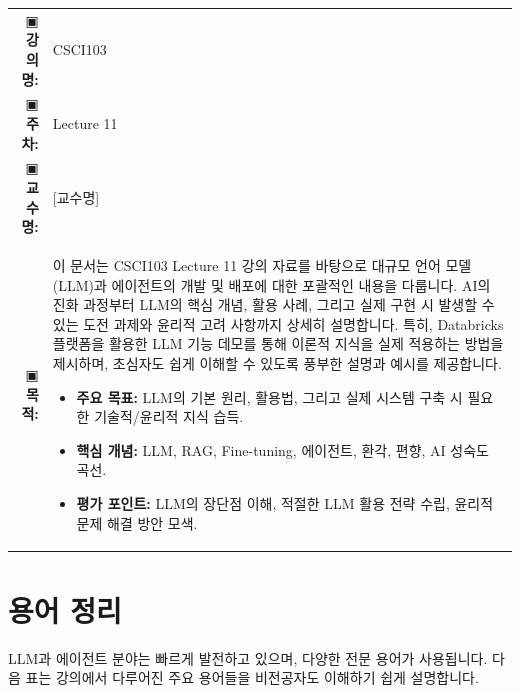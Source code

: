 \documentclass[11pt,a4paper]{article}
\makeatletter
\theoremstyle{definition}
\newcommand{\metainfo}[4]{
\begin{tcolorbox}[
    colback=lightpurple,
    colframe=darkpurple,
    boxrule=1pt,
    arc=2mm,
    left=10pt,
    right=10pt,
    top=8pt,
    bottom=8pt
]
\begin{tabular}{@{}rl@{}}
▣ \textbf{강의명:} & #1 \\[0.3em]
▣ \textbf{주차:} & #2 \\[0.3em]
▣ \textbf{교수명:} & #3 \\[0.3em]
▣ \textbf{목적:} & \begin{minipage}[t]{0.75\textwidth}#4\end{minipage}
\end{tabular}
\end{tcolorbox}
}
\makeatother
\begin{document}
\thispagestyle{firstpage}

\metainfo{CSCI103}{Lecture 11}{[교수명]}{이 문서는 CSCI103 Lecture 11 강의 자료를 바탕으로 대규모 언어 모델(LLM)과 에이전트의 개발 및 배포에 대한 포괄적인 내용을 다룹니다. AI의 진화 과정부터 LLM의 핵심 개념, 활용 사례, 그리고 실제 구현 시 발생할 수 있는 도전 과제와 윤리적 고려 사항까지 상세히 설명합니다. 특히, Databricks 플랫폼을 활용한 LLM 기능 데모를 통해 이론적 지식을 실제 적용하는 방법을 제시하며, 초심자도 쉽게 이해할 수 있도록 풍부한 설명과 예시를 제공합니다.
\begin{itemize}
    \item \textbf{주요 목표:} LLM의 기본 원리, 활용법, 그리고 실제 시스템 구축 시 필요한 기술적/윤리적 지식 습득.
    \item \textbf{핵심 개념:} LLM, RAG, Fine-tuning, 에이전트, 환각, 편향, AI 성숙도 곡선.
    \item \textbf{평가 포인트:} LLM의 장단점 이해, 적절한 LLM 활용 전략 수립, 윤리적 문제 해결 방안 모색.
\end{itemize}}

\tableofcontents

\newpage

\section{용어 정리}

LLM과 에이전트 분야는 빠르게 발전하고 있으며, 다양한 전문 용어가 사용됩니다. 다음 표는 강의에서 다루어진 주요 용어들을 비전공자도 이해하기 쉽게 설명합니다.
\end{document}
